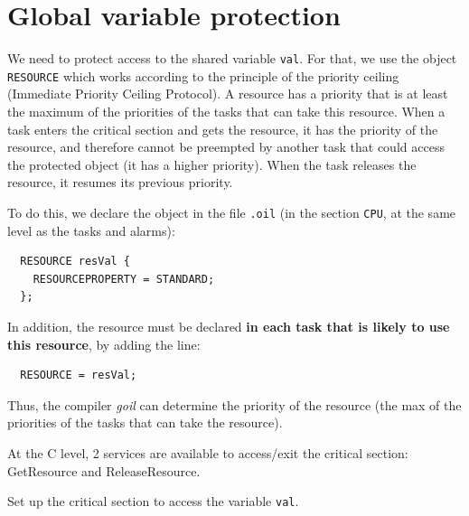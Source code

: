 \documentclass[11pt]{report}
\newcommand{\unixcl}[1]{\texttt{\fcolorbox{black}{gray!20}{\footnotesize#1}}}
\begin{document}
\section{Global variable protection}


We need to protect access to the shared variable \texttt{val}. For that, we use the object \texttt{RESOURCE} which works according to the principle of the priority ceiling (Immediate Priority Ceiling Protocol). A resource has a priority that is at least the maximum of the priorities of the tasks that can take this resource. When a task enters the critical section and gets the resource, it has the priority of the resource, and therefore cannot be preempted by another task that could access the protected object (it has a higher priority). When the task releases the resource, it resumes its previous priority. 

To do this, we declare the object in the file \texttt{.oil} (in the section \texttt{CPU}, at the same level as the tasks and alarms):

\begin{lstlisting}
  RESOURCE resVal {
    RESOURCEPROPERTY = STANDARD;
  };
\end{lstlisting}

In addition, the resource must be declared \textbf{in each task that is likely to use this resource}, by adding the line:
\begin{lstlisting}
  RESOURCE = resVal;
\end{lstlisting}
Thus, the compiler \emph{goil} can determine the priority of the resource (the max of the priorities of the tasks that can take the resource).

At the C level, 2 services are available to access/exit the critical section: GetResource and ReleaseResource.

Set up the critical section to access the variable \texttt{val}. 
%
\end{document}
